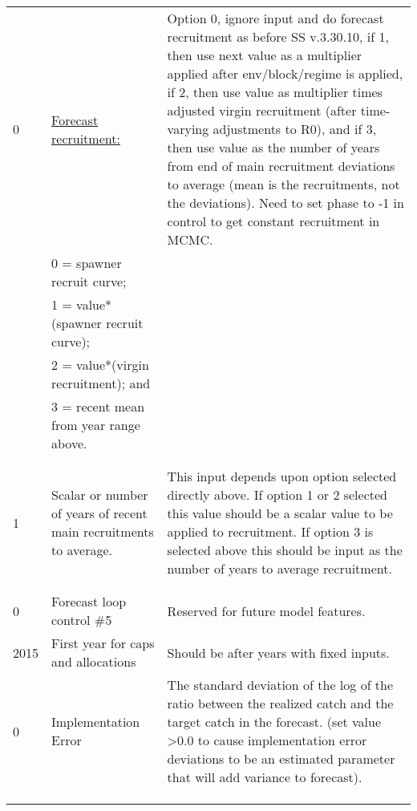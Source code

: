 \begin{landscape}
{\begin{longtable}{p{3.2cm} p{7cm} p{10.8cm}}
 \hline
 0 \Tstrut & \hyperlink{ForeSpawn}{Forecast recruitment:} & \multirow{1}{1cm}[-0.25cm]{\parbox{11cm}{Option 0, ignore input and do forecast recruitment as before SS v.3.30.10, if 1, then use next value as a multiplier applied after env/block/regime is applied, if 2, then use value as multiplier times adjusted virgin recruitment (after time-varying adjustments to R0), and if 3, then use value as the number of years from end of main recruitment deviations to average (mean is the recruitments, not the deviations). Need to set phase to -1 in control to get constant recruitment in MCMC.}} \\
    & 0 = spawner recruit curve; & \\
    & 1 = value*(spawner recruit curve); & \\
    & 2 = value*(virgin recruitment); and & \\
    & 3 = recent mean from year range above. & \\
    & & \\
    & & \\
     
 \hline
 1 \Tstrut & Scalar or number of years of recent main recruitments to average. & \multirow{1}{1cm}[-0.25cm]{\parbox{11cm}{This input depends upon option selected directly above.  If option 1 or 2 selected this value should be a scalar value to be applied to recruitment. If option 3 is selected above this should be input as the number of years to average recruitment.}} \\
 & & \\
 & & \\
 
 0 & Forecast loop control \#5 & Reserved for future model features. \Bstrut\\
 
 \hline
 2015 \Tstrut & First year for caps and allocations & \multirow{1}{1cm}[-0.10cm]{\parbox{11cm}{Should be after years with fixed inputs.}} \Bstrut\\

 \hline
 0 \Tstrut & Implementation Error & \multirow{1}{1cm}[-0.25cm]{\parbox{11cm}{The standard deviation of the log of the ratio between the realized catch and the target catch in the forecast. (set value >0.0 to cause implementation error deviations to be an estimated parameter that will add variance to forecast).}} \\
   &   & \\
   &   & \\
   &   & \Bstrut\\
 

\end{longtable}}
\end{landscape}
